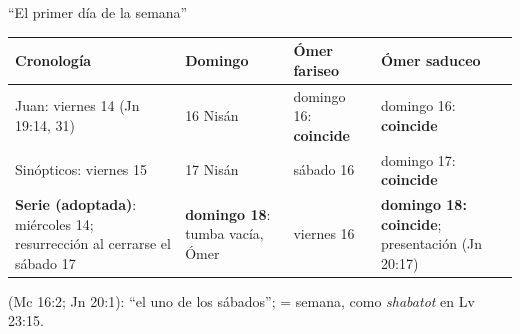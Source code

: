 \begin{frame}{``El primer día de la semana''}
\scriptsize\renewcommand{\arraystretch}{1.12}
\begin{tabular}{@{}L{3.2cm}L{2.4cm}L{2.6cm}L{3.6cm}@{}}
\toprule
\textbf{Cronología} & \textbf{Domingo} & \textbf{Ómer fariseo} & \textbf{Ómer saduceo} \\ \midrule
Juan: viernes 14 (Jn 19:14, 31) & 16 Nisán & domingo 16: \textbf{coincide} & domingo 16: \textbf{coincide} \\
Sinópticos: viernes 15 & 17 Nisán & sábado 16 & domingo 17: \textbf{coincide} \\
\textbf{\color{tierraroja}Serie (adoptada)}: miércoles 14; resurrección al cerrarse el sábado 17 & \textbf{domingo 18}: tumba vacía, Ómer & viernes 16 & \textbf{domingo 18: coincide}; presentación (Jn 20:17) \\
\bottomrule
\end{tabular}\par\medskip
\small\RaggedRight {} (Mc 16:2; Jn 20:1): ``el uno de los sábados'';  = semana, como \emph{shabatot} en Lv 23:15.\par\smallskip
{}
\end{frame}

